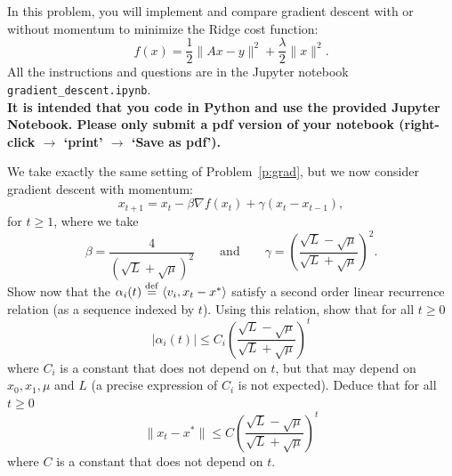 \documentclass[11pt,nocut]{article}
\begin{document}
\vspace{5mm}

\begin{problem}[3 points]
	In this problem, you will implement and compare gradient descent with or without momentum to minimize the Ridge cost function:
	$$
	f(x) = \frac{1}{2} \|Ax-y\|^2 + \frac{\lambda}{2} \|x\|^2.
	$$
	All the instructions and questions are in the Jupyter notebook \texttt{gradient\_descent.ipynb}.
	\\

	\textbf{It is intended that you code in Python and use the provided Jupyter Notebook. Please only submit a pdf version of your notebook (right-click $\to$ `print' $\to$ `Save as pdf').}
\end{problem}


\vspace{5mm}

\begin{problem}[$\star$]
	We take exactly the same setting of Problem~\ref{p:grad}, but we now consider gradient descent with momentum:
$$
x_{t+1} = x_t - \beta \nabla f(x_t) + \gamma(x_t -x_{t-1}),
$$
for $t \geq 1$,
where we take
$$
\beta = \frac{4}{(\sqrt{L} + \sqrt{\mu})^2}
\qquad \text{and} \qquad
\gamma = \left(\frac{\sqrt{L}-\sqrt{\mu}}{\sqrt{L}+\sqrt{\mu}}\right)^{\! 2}.
$$
Show now that the $\alpha_i(t) \overset{\rm def}{=} \langle v_i, x_t - x^* \rangle$ satisfy a second order linear recurrence relation (as a sequence indexed by $t$). Using this relation, show that for all $t \geq 0$
$$
|\alpha_i(t)| \leq C_i \left(\frac{\sqrt{L}-\sqrt{\mu}}{\sqrt{L} + \sqrt{\mu}}\right)^{\! t}
$$
where $C_i$ is a constant that does not depend on $t$, but that may depend on $x_0,x_1, \mu$ and $L$ (a precise expression of $C_i$ is not expected). Deduce that for all $t \geq 0$
$$
\|x_t - x^*\| \leq C \left(\frac{\sqrt{L}-\sqrt{\mu}}{\sqrt{L} + \sqrt{\mu}}\right)^{\! t}
$$
where $C$ is a constant that does not depend on $t$.
\end{problem}




\vspace{1cm}
\centerline{}

%
%
\end{document}

